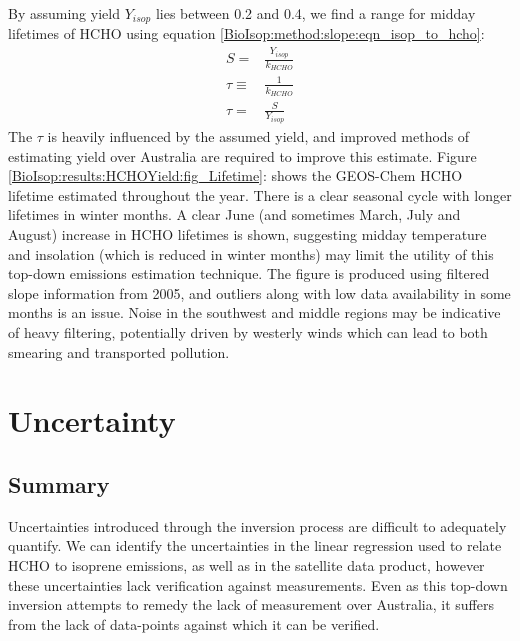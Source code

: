     By assuming yield $Y_{isop}$ lies between 0.2 and 0.4, we find a range for midday lifetimes of HCHO using equation \ref{BioIsop:method:slope:eqn_isop_to_hcho}:
    \begin{eqnarray*}
      S = & \frac{Y_{isop}}{k_{HCHO}} \\
      \tau \equiv & \frac{1}{k_{HCHO}} \\
      \tau = & \frac{S}{Y_{isop}}
    \end{eqnarray*}
    The $\tau$ is heavily influenced by the assumed yield, and improved methods of estimating yield over Australia are required to improve this estimate.
    Figure \ref{BioIsop:results:HCHOYield:fig_Lifetime}: shows the GEOS-Chem HCHO lifetime estimated throughout the year.
    There is a clear seasonal cycle with longer lifetimes in winter months.
    A clear June (and sometimes March, July and August) increase in HCHO lifetimes is shown, suggesting midday temperature and insolation (which is reduced in winter months) may limit the utility of this top-down emissions estimation technique.
    The figure is produced using filtered slope information from 2005, and outliers along with low data availability in some months is an issue.
    Noise in the southwest and middle regions may be indicative of heavy filtering, potentially driven by westerly winds which can lead to both smearing and transported pollution.
    
    
\section{Uncertainty}
\label{BioIsop:uncertainty}
  
  \subsection{Summary}
    \label{BioIsop:uncertainty:summary}
    Uncertainties introduced through the inversion process are difficult to adequately quantify. 
    We can identify the uncertainties in the linear regression used to relate HCHO to isoprene emissions, as well as in the satellite data product, however these uncertainties lack verification against measurements.
    Even as this top-down inversion attempts to remedy the lack of measurement over Australia, it suffers from the lack of data-points against which it can be verified.
    
